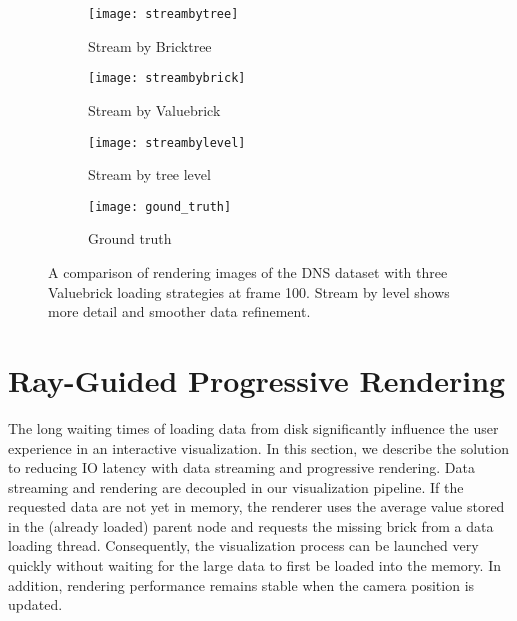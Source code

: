 \begin{figure*}[t]
    \centering
    \begin{subfigure}[b]{0.85\columnwidth}
        \texttt{[image: streambytree]}
        \vspace{-2em}
        \caption{Stream by Bricktree}
        \label{fig:streambytree}
    \end{subfigure}
    \begin{subfigure}[b]{0.85\columnwidth}
        \texttt{[image: streambybrick]}
        \vspace{-2em}
        \caption{Stream by Valuebrick}
        \label{fig:streambybrick}
    \end{subfigure}
    \begin{subfigure}[b]{0.85\columnwidth}
        \texttt{[image: streambylevel]}
        \vspace{-2em}
        \caption{Stream by tree level}
        \label{fig:streambylevel}
    \end{subfigure}
    \begin{subfigure}[b]{0.85\columnwidth}
        \texttt{[image: gound\_truth]}
        \vspace{-2em}
        \caption{Ground truth}
        \label{fig:streambylevel}
    \end{subfigure}
	\caption{\label{fig:streamstrategy}%
	A comparison of rendering images of the DNS dataset with three Valuebrick loading strategies at frame 100. Stream by level shows more detail and smoother data refinement.}
	\vspace{-0.5em}
\end{figure*}


\section{Ray-Guided Progressive Rendering}
The long waiting times of loading data from disk significantly
influence the user experience in an interactive visualization. 
In this section, we describe the solution to reducing IO latency with data streaming and progressive rendering. 
Data streaming and rendering are decoupled in
our visualization pipeline. If the requested data are not yet in memory, the renderer uses 
the average value stored in the (already loaded) parent node
and requests the missing brick from a data loading thread. Consequently,
the visualization process can be launched very quickly without waiting for the large
data to first be loaded into the memory. In addition, rendering performance remains stable 
when the camera position is updated. 


